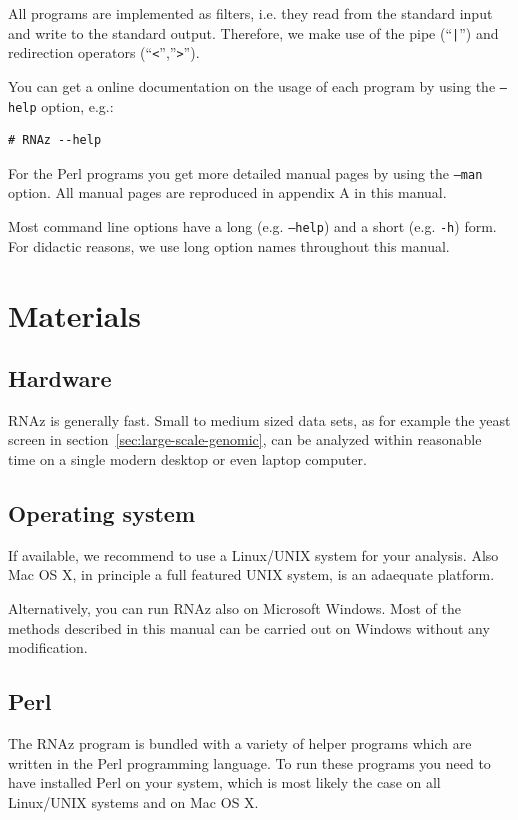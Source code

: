 \documentclass[11pt]{article}
\begin{document}
All programs are implemented as filters, i.e. they read from the standard
input and write to the standard output. Therefore, we make use of the pipe
(``\texttt{|}'') and redirection operators (``\texttt{<}'',''\texttt{>}'').

You can get a online documentation on the usage of each program by using
the \texttt{--help} option, e.g.:

\begin{verbatim}
# RNAz --help
\end{verbatim}

For the Perl programs you get more detailed manual pages by using the
\texttt{--man} option. All manual pages are reproduced in appendix A in
this manual.

Most command line options have a long (e.g. \texttt{--help}) and a short
(e.g. \texttt{-h}) form. For didactic reasons, we use long option names
throughout this manual.

\section{Materials}

\subsection{Hardware}

RNAz is generally fast. Small to medium sized data sets, as for example the
yeast screen in section~\ref{sec:large-scale-genomic}, can be analyzed
within reasonable time on a single modern desktop or even laptop computer.

\subsection{Operating system}

If available, we recommend to use a Linux/UNIX system for your analysis.
Also Mac OS X, in principle a full featured UNIX system, is an adaequate
platform.

Alternatively, you can run RNAz also on Microsoft Windows.  Most of the
methods described in this manual can be carried out on Windows without any
modification.


\subsection{Perl}
\label{sec:perl}

The RNAz program is bundled with a variety of helper programs
which are written in the Perl programming language. To run these programs
you need to have installed Perl on your system, which is most likely the
case on all Linux/UNIX systems and on Mac OS X.
 
\end{document}
